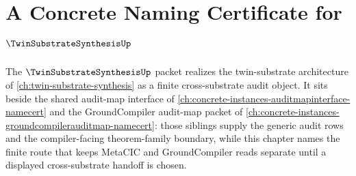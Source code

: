 \chapter{A Concrete Naming Certificate for $\TwinSubstrateSynthesisUp$}
\label{ch:concrete-instances-twinsubstratesynthesis-namecert}

The $\TwinSubstrateSynthesisUp$ packet realizes the twin-substrate architecture of \autoref{ch:twin-substrate-synthesis} as a finite cross-substrate audit object. It sits beside the shared audit-map interface of \autoref{ch:concrete-instances-auditmapinterface-namecert} and the GroundCompiler audit-map packet of \autoref{ch:concrete-instances-groundcompilerauditmap-namecert}: those siblings supply the generic audit rows and the compiler-facing theorem-family boundary, while this chapter names the finite route that keeps MetaCIC and GroundCompiler reads separate until a displayed cross-substrate handoff is chosen.

